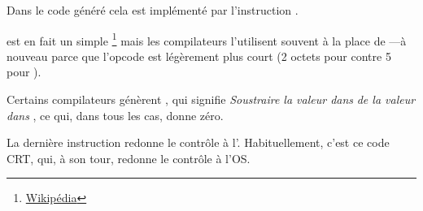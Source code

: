 Dans le code généré cela est implémenté par l'instruction .


\XOR est en fait un simple \footnote{\href{http://go.yurichev.com/17118}{Wikipédia}} mais
les compilateurs l'utilisent souvent à la place de ---à nouveau parce que l'opcode est légèrement plus
court (2 octets pour \XOR contre 5 pour \MOV).

Certains compilateurs génèrent , qui signifie \emph{Soustraire la valeur dans} \EAX \emph{de la valeur dans} \EAX,
 ce qui, dans tous les cas, donne zéro.

La dernière instruction \RET redonne le contrôle à l'.
Habituellement, c'est ce code \CCpp \ac{CRT}, qui, à son tour, redonne le contrôle à l'\ac{OS}.

